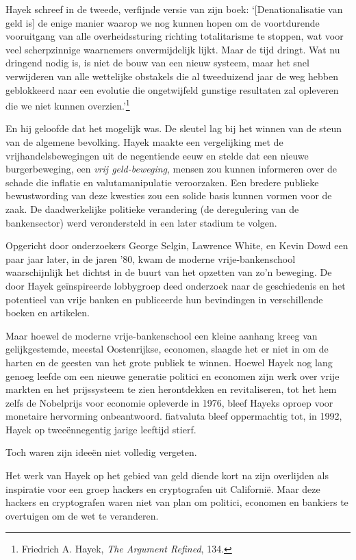 \documentclass[
  a5paper,
  smalldemyvopaper,11pt,twoside,onecolumn,openright,extrafontsizes,
hidelinks]{memoir}
\begin{document}
Hayek schreef in de tweede, verfijnde versie van zijn boek:
`{[}Denationalisatie van geld is{]} de enige manier waarop we nog kunnen
hopen om de voortdurende vooruitgang van alle overheidssturing richting
totalitarisme te stoppen, wat voor veel scherpzinnige waarnemers
onvermijdelijk lijkt. Maar de tijd dringt. Wat nu dringend nodig is, is
niet de bouw van een nieuw systeem, maar het snel verwijderen van alle
wettelijke obstakels die al tweeduizend jaar de weg hebben geblokkeerd
naar een evolutie die ongetwijfeld gunstige resultaten zal opleveren die
we niet kunnen overzien.'\footnote{Friedrich A. Hayek, \emph{The
  Argument Refined}, 134.}

En hij geloofde dat het mogelijk was. De sleutel lag bij het winnen van
de steun van de algemene bevolking. Hayek maakte een vergelijking met de
vrijhandelsbewegingen uit de negentiende eeuw en stelde dat een nieuwe
burgerbeweging, een \emph{vrij geld-beweging}, mensen zou kunnen
informeren over de schade die inflatie en valutamanipulatie veroorzaken.
Een bredere publieke bewustwording van deze kwesties zou een solide
basis kunnen vormen voor de zaak. De daadwerkelijke politieke
verandering (de deregulering van de bankensector) werd verondersteld in
een later stadium te volgen.

Opgericht door onderzoekers George Selgin, Lawrence White, en Kevin Dowd
een paar jaar later, in de jaren '80, kwam de moderne vrije-bankenschool
waarschijnlijk het dichtst in de buurt van het opzetten van zo'n
beweging. De door Hayek geïnspireerde lobbygroep deed onderzoek naar de
geschiedenis en het potentieel van vrije banken en publiceerde hun
bevindingen in verschillende boeken en artikelen.

Maar hoewel de moderne vrije-bankenschool een kleine aanhang kreeg van
gelijkgestemde, meestal Oostenrijkse, economen, slaagde het er niet in
om de harten en de geesten van het grote publiek te winnen. Hoewel Hayek
nog lang genoeg leefde om een nieuwe generatie politici en economen zijn
werk over vrije markten en het prijssysteem te zien herontdekken en
revitaliseren, tot het hem zelfs de Nobelprijs voor economie opleverde
in 1976, bleef Hayeks oproep voor monetaire hervorming onbeantwoord.
fiatvaluta bleef oppermachtig tot, in 1992, Hayek op tweeënnegentig
jarige leeftijd stierf.

Toch waren zijn ideeën niet volledig vergeten.

Het werk van Hayek op het gebied van geld diende kort na zijn overlijden
als inspiratie voor een groep hackers en cryptografen uit Californië.
Maar deze hackers en cryptografen waren niet van plan om politici,
economen en bankiers te overtuigen om de wet te veranderen.
\end{document}
